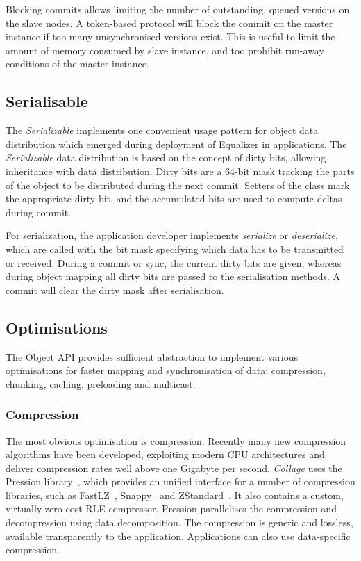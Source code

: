 Blocking commits allows limiting the number of outstanding, queued versions on
the slave nodes. A token-based protocol will block the commit on the master
instance if too many unsynchronised versions exist. This is useful to limit the
amount of memory consumed by slave instance, and too prohibit run-away
conditions of the master instance.

\subsection{Serialisable}

\label{sec:Serializable}The {\em Serializable} implements one convenient usage
pattern for object data distribution which emerged during deployment of
Equalizer in applications. The {\em Serializable} data distribution is based on
the concept of dirty bits, allowing inheritance with data distribution. Dirty
bits are a 64-bit mask tracking the parts of the object to be distributed
during the next commit. Setters of the class mark the appropriate dirty bit,
and the accumulated bits are used to compute deltas during commit.

For serialization, the application developer implements {\em serialize} or
{\em deserialize}, which are called with the bit mask specifying which data
has to be transmitted or received. During a commit or sync, the current dirty
bits are given, whereas during object mapping all dirty bits are passed to the
serialisation methods. A commit will clear the dirty mask after serialisation.


\subsection{Optimisations}

The Object API provides sufficient abstraction to implement various
optimisations for faster mapping and synchronisation of data: compression,
chunking, caching, preloading and multicast.

\subsubsection{Compression}

The most obvious optimisation is compression. Recently many new compression
algorithms have been developed, exploiting modern CPU architectures and
deliver compression rates well above one Gigabyte per second. {\em Collage}
uses the Pression library~\cite{pression}, which provides an unified interface
for a number of compression libraries, such as FastLZ~\cite{jesperfast},
Snappy~\cite{snappy} and ZStandard~\cite{zstd}. It also contains a custom,
virtually zero-cost RLE compressor. Pression parallelises the compression and
decompression using data decomposition. The compression is generic and
lossless, available transparently to the application. Applications can also
use data-specific compression.

